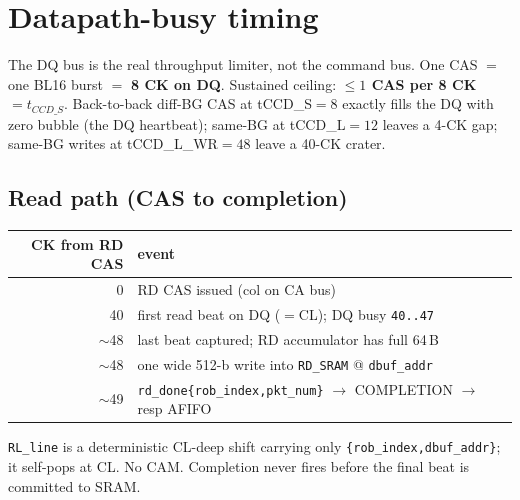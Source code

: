 \documentclass[10pt]{article}
\newcommand{\p}[1]{\texttt{#1}}
\begin{document}
\section{Datapath-busy timing}
The DQ bus is the real throughput limiter, not the command bus. One CAS $=$ one BL16 burst $=$
\textbf{8 CK on DQ}. Sustained ceiling: \textbf{$\le 1$ CAS per 8 CK} $= t_{CCD\_S}$. Back-to-back
diff-BG CAS at tCCD\_S$=8$ exactly fills the DQ with zero bubble (the DQ heartbeat); same-BG at
tCCD\_L$=12$ leaves a 4-CK gap; same-BG writes at tCCD\_L\_WR$=48$ leave a 40-CK crater.

\subsection{Read path (CAS to completion)}
\begin{center}\small
\begin{tabular}{@{}r l@{}}
\toprule
\textbf{CK from RD CAS} & \textbf{event} \\
\midrule
0    & RD CAS issued (col on CA bus) \\
40   & first read beat on DQ ($=$CL); DQ busy \p{40..47} \\
$\sim$48 & last beat captured; RD accumulator has full 64\,B \\
$\sim$48 & one wide 512-b write into \p{RD\_SRAM} @ \p{dbuf\_addr} \\
$\sim$49 & \p{rd\_done\{rob\_index,pkt\_num\}} $\rightarrow$ COMPLETION $\rightarrow$ resp AFIFO \\
\bottomrule
\end{tabular}
\end{center}
\p{RL\_line} is a deterministic CL-deep shift carrying only \p{\{rob\_index,dbuf\_addr\}}; it
self-pops at CL. No CAM. Completion never fires before the final beat is committed to SRAM.
\end{document}
